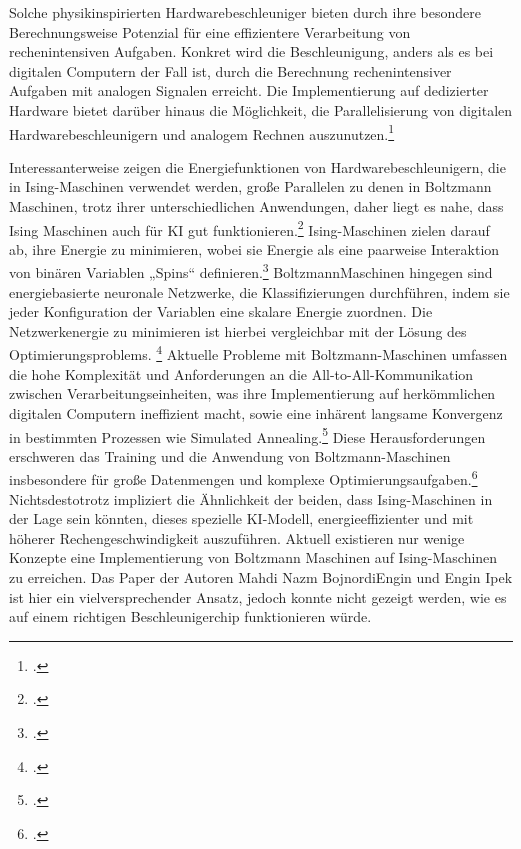 Solche physikinspirierten Hardwarebeschleuniger bieten durch ihre besondere
Berechnungsweise Potenzial für eine effizientere Verarbeitung von
rechenintensiven Aufgaben. Konkret wird die Beschleunigung, anders als es bei
digitalen Computern der Fall ist, durch die Berechnung rechenintensiver Aufgaben
mit analogen Signalen erreicht. Die Implementierung auf dedizierter Hardware bietet
darüber hinaus die Möglichkeit, die Parallelisierung von digitalen
Hardwarebeschleunigern und analogem Rechnen auszunutzen.\footcite[Vgl.][4]{mohseniIsingMachinesHardware2022}

Interessanterweise zeigen die Energiefunktionen von Hardwarebeschleunigern, die
in Ising-Maschinen verwendet werden, große Parallelen zu denen in Boltzmann
Maschinen, trotz ihrer unterschiedlichen Anwendungen, daher liegt es nahe, dass
Ising Maschinen auch für KI gut funktionieren.\footcite[Vgl.][10]{caiHarnessingIntrinsicNoise2019}
Ising-Maschinen zielen darauf ab, ihre Energie zu minimieren, wobei sie Energie als eine paarweise
Interaktion von binären Variablen „Spins“ definieren.\footcite[Vgl.][1]{wangOscillatorbasedIsingMachine2017} 
BoltzmannMaschinen hingegen sind energiebasierte neuronale Netzwerke, die
Klassifizierungen durchführen, indem sie jeder Konfiguration der Variablen eine
skalare Energie zuordnen. Die Netzwerkenergie zu minimieren ist hierbei
vergleichbar mit der Lösung des Optimierungsproblems. \footcite[Vgl.][2]{nazmbojnordiMemristiveBoltzmannMachine2016} 
Aktuelle Probleme mit Boltzmann-Maschinen umfassen die hohe Komplexität und
Anforderungen an die All-to-All-Kommunikation zwischen Verarbeitungseinheiten,
was ihre Implementierung auf herkömmlichen digitalen Computern ineffizient macht,
sowie eine inhärent langsame Konvergenz in bestimmten Prozessen wie Simulated
Annealing.\footcite[Vgl.][1]{nazmbojnordiMemristiveBoltzmannMachine2016} 
Diese Herausforderungen erschweren das Training und die Anwendung von Boltzmann-Maschinen insbesondere für große Datenmengen
und komplexe Optimierungsaufgaben.\footcite[Vgl.][2]{nazmbojnordiMemristiveBoltzmannMachine2016} 
Nichtsdestotrotz impliziert die Ähnlichkeit der beiden, dass Ising-Maschinen in der Lage sein könnten, dieses
spezielle KI-Modell, energieeffizienter und mit höherer Rechengeschwindigkeit
auszuführen. Aktuell existieren nur wenige Konzepte eine Implementierung von
Boltzmann Maschinen auf Ising-Maschinen zu erreichen. Das Paper der Autoren Mahdi Nazm BojnordiEngin und Engin Ipek ist hier ein
vielversprechender Ansatz, jedoch konnte nicht gezeigt werden, wie es auf einem
richtigen Beschleunigerchip funktionieren würde.

